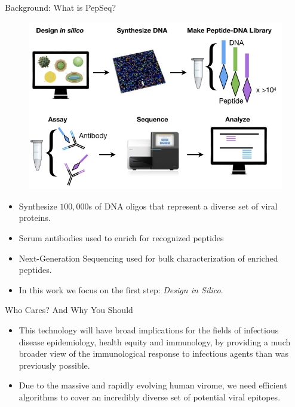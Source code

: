 \documentclass[final]{beamer}
\newlength{\colwidth}
\begin{document}
\begin{frame}[t]
\begin{columns}[t]
\begin{column}{\colwidth}
  \begin{block}{Background: What is PepSeq?}
    \begin{figure}
      \includegraphics[width=0.6\colwidth]{figures/Overview.jpeg}
      \label{fig:library}
    \end{figure}
    \begin{itemize}
    \item Synthesize $100,000$s of DNA oligos that represent a diverse set of viral proteins.
    \item Serum antibodies used to enrich for recognized peptides
    \item Next-Generation Sequencing used for bulk characterization of enriched peptides.
    \item In this work we focus on the first step: \emph{Design in Silico}.

    \end{itemize}
  \end{block}

  \begin{block}{Who Cares? And Why You Should}
    \begin{itemize}
      \item This technology will have broad
            implications for the fields of infectious disease epidemiology, health equity and immunology, by providing a
            much broader view of the immunological response to infectious agents than was previously possible.
          \item  Due to the massive and rapidly evolving human virome,
            we need efficient algorithms to cover an incredibly diverse set of potential viral epitopes.


\end{itemize}
\end{block}
\end{column}
\end{columns}
\end{frame}
\end{document}
